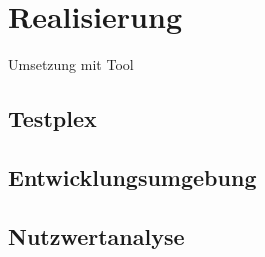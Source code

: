 \chapter{Realisierung}\label{ch:realisierung}

Umsetzung mit Tool

\section{Testplex}

\section{Entwicklungsumgebung}

\section{Nutzwertanalyse}
